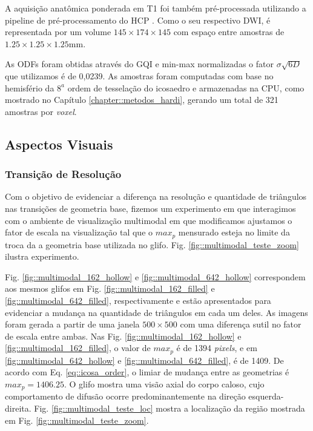 \documentclass[
    12pt,                %
    oneside,            %
    a4paper,            %
    english,            %
    french,                %
    spanish,            %
    brazil                %
    ]{abntex2}
\begin{document}
A aquisição anatômica ponderada em T1 foi também pré-processada utilizando a pipeline de pré-processamento do HCP \cite{glasser2013}. Como o seu respectivo DWI, é representada por um volume $145\times 174\times  145$ com espaço entre amostras de $1.25\times 1.25\times 1.25$mm.

As ODFs foram obtidas através do GQI \cite{yeh2010} e min-max normalizadas o fator $\sigma \sqrt{6D}$ que utilizamos é de 0,0239. As amostras foram computadas com base no hemisfério da $8^{a}$ ordem de tesselação do icosaedro e armazenadas na CPU, como mostrado no Capítulo \ref{chapter::metodos_hardi}, gerando um total de 321 amostras por \textit{voxel}.

\subsection{Aspectos Visuais}
\label{ssec::aspectos_visuais}

\subsubsection{Transição de Resolução}

Com o objetivo de evidenciar a diferença na resolução e quantidade de triângulos nas transições de geometria base, fizemos um experimento em que interagimos com o ambiente de visualização multimodal em que modificamos ajustamos o fator de escala na visualização tal que o $max_p$ mensurado esteja no limite da troca da a geometria base utilizada no glifo. Fig.  \ref{fig::multimodal_teste_zoom} ilustra experimento.

Fig. \ref{fig::multimodal_162_hollow} e \ref{fig::multimodal_642_hollow} correspondem aos mesmos glifos em Fig. \ref{fig::multimodal_162_filled} e \ref{fig::multimodal_642_filled}, respectivamente e estão apresentados para evidenciar a mudança na quantidade de triângulos em cada um deles. As imagens foram gerada a partir de uma janela $500 \times 500$ com uma diferença sutil no fator de escala entre ambas. Nas Fig. \ref{fig::multimodal_162_hollow} e \ref{fig::multimodal_162_filled}, o valor de $max_p$ é de 1394 \textit{pixels}, e em \ref{fig::multimodal_642_hollow} e \ref{fig::multimodal_642_filled}, é de 1409. De acordo com Eq. \ref{eq::icosa_order}, o limiar de mudança entre as geometrias é $max_p = 1406.25$.  O glifo mostra uma visão axial do corpo caloso, cujo comportamento de difusão ocorre predominantemente na direção esquerda-direita. Fig. \ref{fig::multimodal_teste_loc} mostra a localização da região mostrada em Fig. \ref{fig::multimodal_teste_zoom}.
\end{document}
